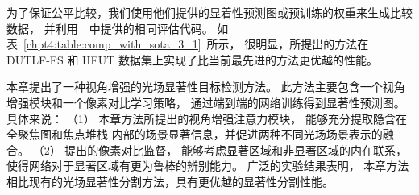为了保证公平比较，我们使用他们提供的显着性预测图或预训练的权重来生成比较数据，
并利用~\cite{liu2021visual}~中提供的相同评估代码。 
如表~\ref{chpt4:table:comp_with_sota_3_1}~所示，
很明显，所提出的方法在 DUTLF-FS 和 HFUT 数据集上实现了比当前最先进的方法更优越的性能。
%
%


本章提出了一种视角增强的光场显著性目标检测方法。
此方法主要包含一个视角增强模块和一个像素对比学习策略，
通过端到端的网络训练得到显著性预测图。
具体来说：
（1）
%
%
本章方法所提出的视角增强注意力模块，
能够充分提取隐含在全聚焦图和焦点堆栈
内部的场景显著信息，并促进两种不同光场场景表示的融合。
（2）
%
%
提出的像素对比监督，
能够考虑显著区域和非显著区域的内在联系，
使得网络对于显著区域有更为鲁棒的辨别能力。
%
%
广泛的实验结果表明，
本章方法相比现有的光场显著性分割方法，具有更优越的显著性分割性能。








